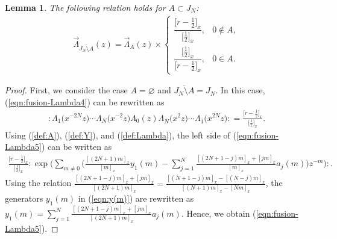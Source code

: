 \documentclass[10pt,a4paper]{amsart}
\numberwithin{equation}{section}
\newtheorem{Lemma}[Theorem]{Lemma}
\begin{document}
\begin{Lemma}
The following relation holds for $A \subset J_N$:
\begin{gather}
\overrightarrow{\Lambda}_{\overline{J_N \setminus A}}(z)=
\overrightarrow{\Lambda}_{A}(z)\times
\begin{cases}
\dfrac{\big[r-\frac{1}{2}\big]_x}{\big[\frac{1}{2}\big]_x},& 0 \notin A,
\\[2.5ex]
\dfrac{\big[\frac{1}{2}\big]_x}{\big[r-\frac{1}{2}\big]_x},& 0 \in A.
\end{cases}
\label{eqn:fusion-Lambda4}
\end{gather}
\end{Lemma}
\begin{proof}
First, we {consider} the case $A=\varnothing$ and $\overline{J_N \setminus A}=J_N$.
In this case, (\ref{eqn:fusion-Lambda4}) {can be} rewritten as
\begin{gather}
{:}\Lambda_1\big(x^{-2N}z\big)\cdots \Lambda_{N}\big(x^{-2}z\big)
\Lambda_0(z)\Lambda_{\overline{N}}\big(x^2z\big)\cdots
\Lambda_{\overline{1}}\big(x^{2N}z\big){:}=\frac{\big[r-\frac{1}{2}\big]_x}{\big[\frac{1}{2}\big]_x}.
\label{eqn:fusion-Lambda5}
\end{gather}
Using (\ref{def:A}), (\ref{def:Y}), and (\ref{def:Lambda}),
the left side of (\ref{eqn:fusion-Lambda5}) can be written as
\begin{gather*}
\frac{\big[r-\frac{1}{2}\big]_x}{\big[\frac{1}{2}\big]_x}{:}\exp\Bigg(\sum_{m \neq 0}
\Bigg(\frac{[(2N+1)m]_x}{[m]_x}y_1(m)-\sum_{j=1}^N
\frac{[(2N+1-j)m]_x+[jm]_x}{[m]_x}a_j(m)\Bigg)z^{-m}\Bigg){:}.
\end{gather*}
Using the relation ${\frac{[(2N+1-j)m]_x+[jm]_x}{[(2N+1)m]_x}=
\frac{[(N+1-j)m]_x-[(N-j)m]_x}{[(N+1)m]_x-[Nm]_x}}$,
the generators $y_1(m)$ in (\ref{eqn:y(m)}) are rewritten as
${y_1(m)=\sum_{j=1}^N
\frac{[(2N+1-j)m]_x+[jm]_x}{[(2N+1)m]_x}a_j(m)}$.
Hence, we obtain (\ref{eqn:fusion-Lambda5}).


\end{proof}
\end{document}
